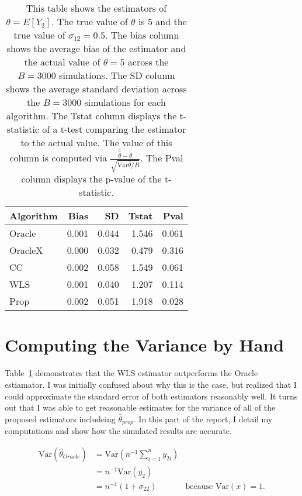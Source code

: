 \documentclass[12pt]{article}
\newcommand{\Var}{{\text{Var}}}
\begin{document}
\begin{itemize}
    \begin{table}[ht!]
      \label{tab:res}
      \caption{This table shows the estimators of $\theta = E[Y_2]$. The true 
        value of $\theta$ is $5$ and the true value of $\sigma_{12} = 0.5$.
        The bias column shows the average bias of the 
      estimator and the actual value of $\theta = 5$ across the $B = 3000$ 
      simulations. The SD column shows the average standard deviation across the 
      $B = 3000$ simulations for each algorithm. The Tstat column displays the 
      t-statistic of a t-test comparing the estimator to the actual value. 
      The value of this column is computed via $\frac{\bar{\hat{\theta}} - 
      \theta}{\sqrt{\Var{\hat \theta}/B}}$. The Pval column displays the 
      p-value of the t-statistic.}
      \centering
      \begin{tabular}[t]{lrrrr}
        \toprule
        Algorithm & Bias & SD & Tstat & Pval\\
        \midrule
        Oracle & 0.001 & 0.044 & 1.546 & 0.061\\
        OracleX & 0.000 & 0.032 & 0.479 & 0.316\\
        CC & 0.002 & 0.058 & 1.549 & 0.061\\
        WLS & 0.001 & 0.040 & 1.207 & 0.114\\
        Prop & 0.002 & 0.051 & 1.918 & 0.028\\
        \bottomrule
      \end{tabular}
    \end{table}

\end{itemize}

\section*{Computing the Variance by Hand}

Table~\ref{tab:res} demonstrates that the WLS estimator outperforms the 
Oracle estiamator. I was initially confused about why this is the case, but
realized that I could approximate the standard error of both estimators
reasonably well. It turns out that I was able to get reasonable estimates 
for the variance of all of the proposed estimators includeing $\hat
\theta_{prop}$. In this part of the report, I detail my computations and show
how the simulated results are accurate.

\begin{align}\label{eq:varor}
  \Var(\hat \theta_{Oracle}) 
  &= \Var\left(n^{-1} \sum_{i = 1}^n y_{2i}\right) \nonumber \\
  &= n^{-1} \Var(y_{2}) \nonumber \\
  &= n^{-1} (1 + \sigma_{22}) & \text{because $\Var(x) = 1$.}
\end{align}
\end{document}
